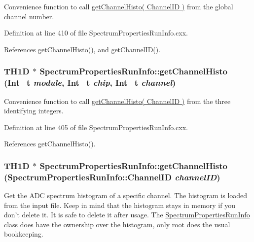 Convenience function to call \hyperlink{class_spectrum_properties_run_info_a7465313bd615a37ae548fecb6d2b11df}{getChannelHisto( ChannelID )} from the global channel number. 

Definition at line 410 of file SpectrumPropertiesRunInfo.cxx.

References getChannelHisto(), and getChannelID().\hypertarget{class_spectrum_properties_run_info_a62d810cc68f737fc7504bc0efdbb1a32}{
\subsubsection[{getChannelHisto}]{\setlength{\rightskip}{0pt plus 5cm}TH1D $\ast$ SpectrumPropertiesRunInfo::getChannelHisto (Int\_\-t {\em module}, \/  Int\_\-t {\em chip}, \/  Int\_\-t {\em channel})}}
\label{class_spectrum_properties_run_info_a62d810cc68f737fc7504bc0efdbb1a32}


Convenience function to call \hyperlink{class_spectrum_properties_run_info_a7465313bd615a37ae548fecb6d2b11df}{getChannelHisto( ChannelID )} from the three identifying integers. 

Definition at line 405 of file SpectrumPropertiesRunInfo.cxx.

References getChannelHisto().\hypertarget{class_spectrum_properties_run_info_a7465313bd615a37ae548fecb6d2b11df}{
\subsubsection[{getChannelHisto}]{\setlength{\rightskip}{0pt plus 5cm}TH1D $\ast$ SpectrumPropertiesRunInfo::getChannelHisto ({\bf SpectrumPropertiesRunInfo::ChannelID} {\em channelID})}}
\label{class_spectrum_properties_run_info_a7465313bd615a37ae548fecb6d2b11df}


Get the ADC spectrum histogram of a specific channel. The histogram is loaded from the input file. Keep in mind that the histogram stays in memory if you don't delete it. It is safe to delete it after usage. The \hyperlink{class_spectrum_properties_run_info}{SpectrumPropertiesRunInfo} class does have the ownership over the histogram, only root does the usual bookkeeping.

